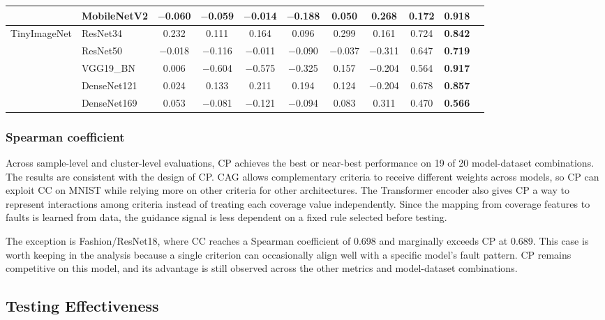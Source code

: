 \documentclass[preprint,number,5p,twocolumn]{elsarticle}
\begin{document}
\begin{table}[htbp]
\begin{tabular}{l|lccccccccc}
      & MobileNetV2 & $-$0.060 & $-$0.059 & $-$0.014 & $-$0.188 & 0.050 & 0.268 & 0.172 & \textbf{0.918} \\
    \midrule
    \multirow{5}{*}{TinyImageNet}
      & ResNet34    & 0.232 & 0.111 & 0.164 & 0.096 & 0.299 & 0.161 & 0.724 & \textbf{0.842} \\
      & ResNet50    & $-$0.018 & $-$0.116 & $-$0.011 & $-$0.090 & $-$0.037 & $-$0.311 & 0.647 & \textbf{0.719} \\
      & VGG19\_BN   & 0.006 & $-$0.604 & $-$0.575 & $-$0.325 & 0.157 & $-$0.204 & 0.564 & \textbf{0.917} \\
      & DenseNet121 & 0.024 & 0.133 & 0.211 & 0.194 & 0.124 & $-$0.204 & 0.678 & \textbf{0.857} \\
      & DenseNet169 & 0.053 & $-$0.081 & $-$0.121 & $-$0.094 & 0.083 & 0.311 & 0.470 & \textbf{0.566} \\
    \bottomrule
  \end{tabular}
\end{table}

\subsubsection{Spearman coefficient}

Across sample-level and cluster-level evaluations, CP achieves the best or near-best performance on 19 of 20 model-dataset combinations. The results are consistent with the design of CP. CAG allows complementary criteria to receive different weights across models, so CP can exploit CC on MNIST while relying more on other criteria for other architectures. The Transformer encoder also gives CP a way to represent interactions among criteria instead of treating each coverage value independently. Since the mapping from coverage features to faults is learned from data, the guidance signal is less dependent on a fixed rule selected before testing.

The exception is Fashion/ResNet18, where CC reaches a Spearman coefficient of 0.698 and marginally exceeds CP at 0.689. This case is worth keeping in the analysis because a single criterion can occasionally align well with a specific model's fault pattern. CP remains competitive on this model, and its advantage is still observed across the other metrics and model-dataset combinations.

\subsection{Testing Effectiveness}\label{sec:rq2}
\end{document}
